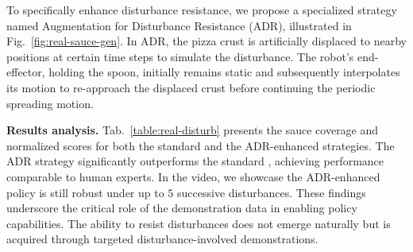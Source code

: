 To specifically enhance disturbance resistance, we propose a specialized strategy named Augmentation for Disturbance Resistance (ADR), illustrated in Fig.~\ref{fig:real-sauce-gen}. In ADR, the pizza crust is artificially displaced to nearby positions at certain time steps to simulate the disturbance. The robot's end-effector, holding the spoon, initially remains static and subsequently interpolates its motion to re-approach the displaced crust before continuing the periodic spreading motion.






\vspace{0.2cm} \noindent\textbf{Results analysis.} Tab.~\ref{table:real-disturb} presents the sauce coverage and normalized scores for both the standard \method and the ADR-enhanced \method strategies. The ADR strategy significantly outperforms the standard \method, achieving performance comparable to human experts.
In the video, we showcase the ADR-enhanced policy is still robust under up to $5$ successive disturbances.
These findings underscore the critical role of the demonstration data in enabling policy capabilities. The ability to resist disturbances does not emerge naturally but is acquired through targeted disturbance-involved demonstrations.






